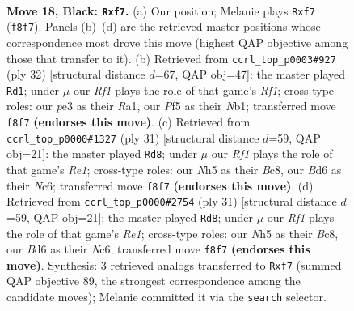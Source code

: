 \documentclass[11pt]{article}
\begin{document}
\clearpage

\begin{figure}[p]\centering
\begin{subfigure}{0.46\textwidth}\centering
\resizebox{\linewidth}{!}{%
\newchessgame
\chessboard[
  setfen={r1b2r1k/pp3Npp/n2b4/P2B1p1n/8/1P2P1P1/5P2/RNB2RK1 b - - 2 18},
  showmover=false,
  pgfstyle=straightmove, color=movearrow, markmove={f8-f7}
]}
\caption{}
\end{subfigure}\hfill
\begin{subfigure}{0.46\textwidth}\centering
\resizebox{\linewidth}{!}{%
\newchessgame
\chessboard[
  setfen={r1b2rk1/p4pp1/2p4p/3n4/2Bbp3/7P/PPP2PP1/RNB2RK1 w - - 1 17},
  showmover=false,
  pgfstyle=straightmove, color=movearrow, markmove={f1-d1}
]}
\caption{}
\end{subfigure}
\\[4pt]
\begin{subfigure}{0.46\textwidth}\centering
\resizebox{\linewidth}{!}{%
\newchessgame
\chessboard[
  setfen={r1b1r1k1/pp3pp1/2n4p/2n5/2BN4/P3P2P/5PP1/R1BR2K1 b - - 1 16},
  showmover=false,
  pgfstyle=straightmove, color=movearrow, markmove={e8-d8}
]}
\caption{}
\end{subfigure}\hfill
\begin{subfigure}{0.46\textwidth}\centering
\resizebox{\linewidth}{!}{%
\newchessgame
\chessboard[
  setfen={r1b1r1k1/pp3pp1/2n4p/2n5/2BN4/P3P2P/5PP1/R1BR2K1 b - - 1 16},
  showmover=false,
  pgfstyle=straightmove, color=movearrow, markmove={e8-d8}
]}
\caption{}
\end{subfigure}
\caption{\textbf{Move 18, Black: \texttt{Rxf7}.} (a) Our position; Melanie plays \texttt{Rxf7} (\texttt{f8f7}). Panels (b)--(d) are the retrieved master positions whose correspondence most drove this move (highest QAP objective among those that transfer to it). (b) Retrieved from \texttt{ccrl\_top\_p0003\#927} (ply 32) [structural distance $d$=67, QAP obj=47]: the master played \texttt{Rd1}; under $\mu$ our \emph{Rf1} plays the role of that game's \emph{Rf1}; cross-type roles: our \emph{p}e3 as their \emph{R}a1, our \emph{P}f5 as their \emph{N}b1; transferred move \texttt{f8f7} \textbf{(endorses this move)}. (c) Retrieved from \texttt{ccrl\_top\_p0000\#1327} (ply 31) [structural distance $d$=59, QAP obj=21]: the master played \texttt{Rd8}; under $\mu$ our \emph{Rf1} plays the role of that game's \emph{Re1}; cross-type roles: our \emph{N}h5 as their \emph{B}c8, our \emph{B}d6 as their \emph{N}c6; transferred move \texttt{f8f7} \textbf{(endorses this move)}. (d) Retrieved from \texttt{ccrl\_top\_p0000\#2754} (ply 31) [structural distance $d$=59, QAP obj=21]: the master played \texttt{Rd8}; under $\mu$ our \emph{Rf1} plays the role of that game's \emph{Re1}; cross-type roles: our \emph{N}h5 as their \emph{B}c8, our \emph{B}d6 as their \emph{N}c6; transferred move \texttt{f8f7} \textbf{(endorses this move)}. Synthesis: 3 retrieved analogs transferred to \texttt{Rxf7} (summed QAP objective 89, the strongest correspondence among the candidate moves); Melanie committed it via the \texttt{search} selector.}
\label{fig:thought-m35}
\end{figure}
\end{document}
